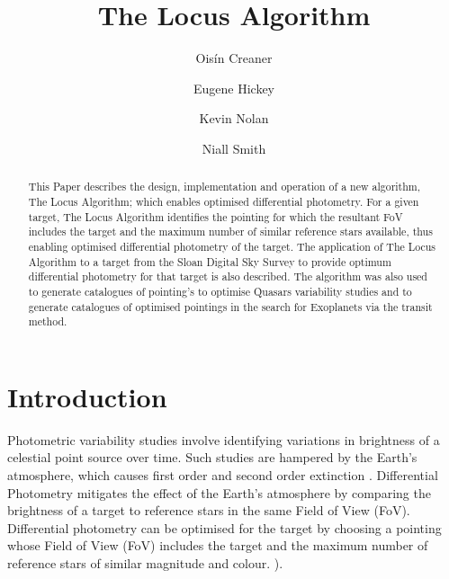 \documentclass[]{elsarticle} %
\begin{document}
\begin{frontmatter}

\title{The Locus Algorithm}


\author[DIAS,TUD]{Ois\'in Creaner}

\author[TUD]{Eugene Hickey}
\author[TUD]{Kevin Nolan}
\author[CIT]{Niall Smith}

\address[DIAS]{Dublin Institute for Advanced Studies, 31 Fitzwilliam Place, Dublin 2, Ireland}
\address[TUD]{Technological University Dublin, Tallaght Campus, Dublin 24, Ireland}
\address[CIT]{Cork Institute of Technology, Bishopstown, Cork, Ireland}

  
  \begin{abstract}
  This Paper describes the design, implementation and operation of a new algorithm,
  The Locus Algorithm; which enables optimised differential photometry.
  For a given target, The Locus Algorithm identifies the pointing for
  which the resultant FoV includes the target and the maximum number of
  similar reference stars available, thus enabling optimised differential
  photometry of the target. The application of The Locus
  Algorithm to a target from the Sloan Digital Sky Survey to provide
  optimum differential photometry for that target is also described. The algorithm was also
  used to generate catalogues of pointing's to optimise Quasars
  variability studies and to generate catalogues of optimised pointings in
  the search for Exoplanets via the transit method.
  \end{abstract}
  
 \end{frontmatter}

\hypertarget{introduction}{%
\section{Introduction}\label{introduction}}

Photometric variability studies involve identifying variations in
brightness of a celestial point source over time. Such studies are
hampered by the Earth's atmosphere, which causes first order and second
order extinction \citep{milone2011high,young1991precise}. Differential
Photometry mitigates the effect of the Earth's atmosphere by comparing
the brightness of a target to reference stars in the same Field of View
(FoV). Differential photometry can be optimised for the target by
choosing a pointing whose Field of View (FoV) includes the target and
the maximum number of reference stars of similar magnitude and colour.
\citep{milone2011high,young1991precise,howell2006handbook,honeycutt1992ccd}).
\end{document}
